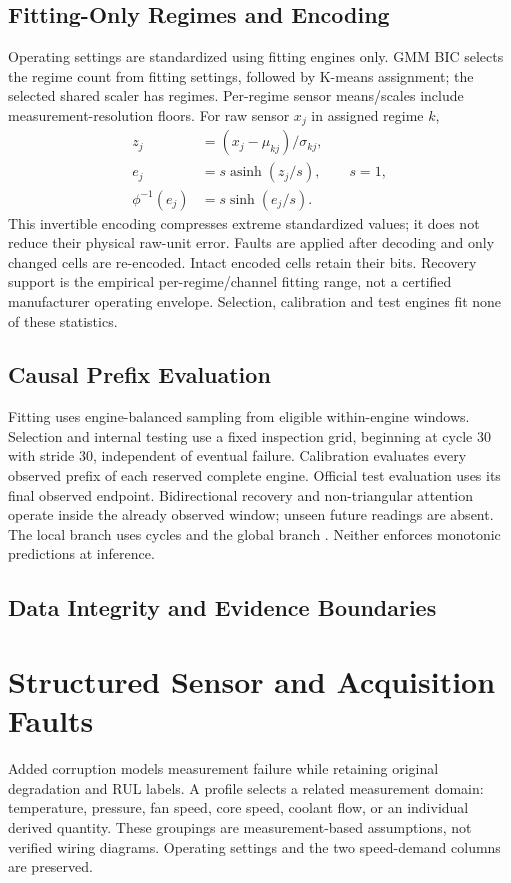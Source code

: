 \documentclass[conference]{IEEEtran}
\begin{document}
\subsection{\textbf{Fitting-Only Regimes and Encoding}}
Operating settings are standardized using fitting engines only. GMM BIC selects
the regime count from fitting settings, followed by K-means assignment; the
selected shared scaler has \CurrentRegimeCount{} regimes. Per-regime sensor
means/scales include measurement-resolution floors. For raw sensor $x_j$ in
assigned regime $k$,
\begin{align}
 z_j&=(x_j-\mu_{kj})/\sigma_{kj},\\
 e_j&=s\operatorname{asinh}(z_j/s),\qquad s=1,\\
 \phi^{-1}(e_j)&=s\sinh(e_j/s).
 \label{eq:encoding}
\end{align}
This invertible encoding compresses extreme standardized values; it does not
reduce their physical raw-unit error. Faults are applied after decoding and only
changed cells are re-encoded. Intact encoded cells retain their bits. Recovery
support is the empirical per-regime/channel fitting range, not a certified
manufacturer operating envelope. Selection, calibration and test engines fit
none of these statistics.

\subsection{\textbf{Causal Prefix Evaluation}}
Fitting uses engine-balanced sampling from eligible within-engine windows.
Selection and internal testing use a fixed inspection grid, beginning at cycle
30 with stride 30, independent of eventual failure. Calibration evaluates every
observed prefix of each reserved complete engine. Official test evaluation uses
its final observed endpoint. Bidirectional recovery and non-triangular attention
operate inside the already observed window; unseen future readings are absent.
The local branch uses \CurrentLocalLength{} cycles and the global branch
\CurrentGlobalLength{}. Neither enforces monotonic predictions at inference.

\subsection{\textbf{Data Integrity and Evidence Boundaries}}


\section{\textbf{Structured Sensor and Acquisition Faults}}
\label{sec:faults}
Added corruption models measurement failure while retaining original degradation and RUL labels. A profile selects a related measurement domain: temperature, pressure, fan speed, core speed, coolant flow, or an individual derived quantity. These groupings are measurement-based assumptions, not verified wiring diagrams. Operating settings and the two speed-demand columns are preserved.
\end{document}
